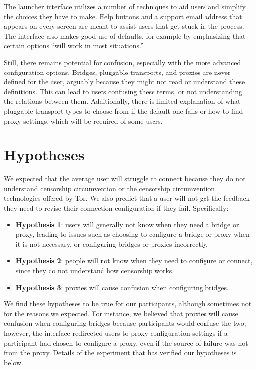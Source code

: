\documentclass{template}
\begin{document}
The launcher interface utilizes a number of techniques to aid users and simplify
the choices they have to make. Help buttons and a support email address that
appears on every screen are meant to assist users that get stuck in the process.
The interface also makes good use of defaults, for example by emphasizing that
certain options ``will work in most situations.''

Still, there remains potential for confusion, especially with the more advanced
configuration options.
Bridges, pluggable transports, and proxies are never defined for the user,
arguably because they might not read or understand these definitions.
This can lead to users confusing these terms, or not understanding
the relations between them. Additionally, there is limited explanation of 
what pluggable transport types to choose from if the default one fails or how to 
find proxy settings, which will be required of some users. 

\section{Hypotheses}
We expected that the average user will struggle to connect because they do not understand censorship circumvention or the  censorship circumvention technologies offered by Tor. We also predict that a user will not get the feedback they need to revise their connection configuration if they fail. Specifically: 

\begin{itemize} \itemsep1pt \parskip0pt 
\item  {\bfseries Hypothesis 1}: users will generally not know when they need a bridge or proxy, leading to issues such as choosing to configure a bridge or proxy when it is not necessary, or configuring bridges or proxies incorrectly.
\item  {\bfseries Hypothesis 2}: people will not know when they need to configure or connect, since they do not understand how censorship works.   
\item  {\bfseries Hypothesis 3}: proxies will cause confusion when configuring bridges. 
\end{itemize} 

We find these hypotheses to be true for our participants, although sometimes not for the reasons we expected. For instance, we believed that proxies will cause confusion when configuring bridges because participants would confuse the two; however, the interface redirected users to proxy configuration settings if a participant had chosen to configure a proxy, even if the source of failure was not from the proxy. Details of the experiment that has verified our hypotheses is below.
\end{document}
